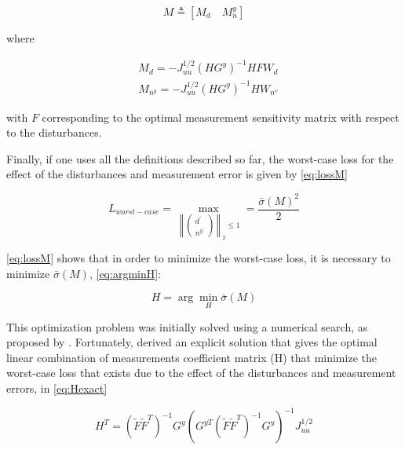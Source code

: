 \documentclass[../msc-thesis.tex]{subfiles}
\begin{document}
\begin{equation}
	M \triangleq\left[M_{d} \quad M_{n}^{y}\right]
	\label{eq:linearM}
\end{equation}

where

\begin{equation}
	\begin{aligned}
		&M_{d}=-J_{u u}^{1 / 2}\left(H G^{y}\right)^{-1} H F W_{d}\\
		&M_{n^{y}}=-J_{u u}^{1 / 2}\left(H G^{y}\right)^{-1} H W_{n^{v}}
		\end{aligned}
	\label{eq:linearms}
\end{equation}

with $F$ corresponding to the optimal measurement sensitivity matrix with 
respect to the disturbances.

Finally, if one uses all the definitions described so far, the worst-case loss 
for the effect of the disturbances and measurement error is given by 
\autoref{eq:lossM}

\begin{equation}
	L_{worst-case} = \max _{\left\|\left(\begin{array}{l}
		{d^{\prime}} \\
		{n^{y^{\prime}}}
		\end{array}\right)\right\|_{2} \leq 1}=\frac{\bar{\sigma}(M)^{2}}{2}
	\label{eq:lossM}
\end{equation}

\autoref{eq:lossM} shows that in order to minimize the worst-case loss, it is 
necessary to minimize $\bar{\sigma}(M)$, \autoref{eq:argminH}:

\begin{equation}
	H=\arg \min _{H} \bar{\sigma}(M)
	\label{eq:argminH}
\end{equation}

This optimization problem was initially solved using a numerical search, as 
proposed by \textcite{Halvorsen2003}. Fortunately, \textcite{Alstad2009} 
derived an explicit solution that gives the optimal linear combination of 
measurements coefficient matrix (H) that minimize the worst-case loss that 
exists due to the effect of the disturbances and measurement errors, in 
\autoref{eq:Hexact}

\begin{equation}
	H^{T}=\left(\tilde{F} \tilde{F}^{T}\right)^{-1} G^{y}\left(G^{y T}\left(\tilde{F} \tilde{F}^{T}\right)^{-1} G^{y}\right)^{-1} J_{u u}^{1 / 2}
	\label{eq:Hexact}
\end{equation}
\end{document}
